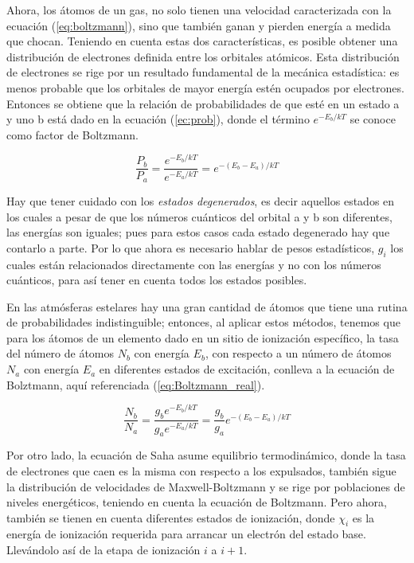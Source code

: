 \documentclass[12pt,oneside,openany,letter]{book}
\begin{document}
\noindent Ahora, los átomos de un gas, no solo tienen una velocidad caracterizada con la ecuación (\ref{eq:boltzmann}), sino  que también ganan y pierden energía a medida que chocan. Teniendo en cuenta estas dos características, es posible obtener una distribución de electrones definida entre los orbitales atómicos. Esta distribución de electrones se rige por un resultado fundamental de la mecánica estadística: es menos probable que los orbitales de mayor energía estén ocupados por electrones. Entonces se obtiene que la relación de probabilidades de que esté en un estado a y uno b está dado en la ecuación (\ref{ec:prob}), donde el término $e^{-E_{b} / k T}$ se conoce como factor de Boltzmann. 

\begin{equation}
\frac{P_b}{P_a}=\frac{e^{-E_{b} / k T}}{e^{-E_{a} / k T}}=e^{-\left(E_{b}-E_{a}\right) / k T}
\label{ec:prob}
\end{equation}

\noindent Hay que tener cuidado con los \textit{estados degenerados}, es decir aquellos estados en los cuales a pesar de que los números cuánticos del orbital a y b son diferentes, las energías son iguales; pues para estos casos cada estado degenerado hay que contarlo a parte. Por lo que ahora es necesario hablar de pesos estadísticos, $g_i$ los cuales están relacionados directamente con las energías y no con los números cuánticos, para así tener en cuenta todos los estados posibles.

\noindent En las atmósferas estelares hay una gran cantidad de átomos que tiene una rutina de probabilidades indistinguible; entonces, al aplicar estos métodos, tenemos que para los átomos de un elemento dado en un sitio de ionización específico, la tasa del número de átomos $N_b$ con energía $E_b$, con respecto a un número de átomos $N_a$ con energía $E_a$ en diferentes estados de excitación, conlleva a la ecuación de Bolztmann, aquí referenciada (\ref{eq:Boltzmann_real}).

\begin{equation}
\frac{N_{b}}{N_{a}}=\frac{g_{b} e^{-E_{b} / k T}}{g_{a} e^{-E_{a} / k T}}=\frac{g_{b}}{g_{a}} e^{-\left(E_{b}-E_{a}\right) / kT}
\label{eq:Boltzmann_real}
\end{equation}


\noindent Por otro lado, la ecuación de Saha asume equilibrio termodinámico, donde la tasa de electrones que caen es la misma con respecto a los expulsados, también sigue la distribución de velocidades de Maxwell-Boltzmann y se rige por poblaciones de niveles energéticos, teniendo en cuenta la ecuación de Boltzmann. Pero ahora, también se tienen en cuenta diferentes estados de ionización, donde $\chi_i$ es la energía de ionización requerida para arrancar un electrón del estado base. Llevándolo así de la etapa de ionización $i$ a $i+1$.
\end{document}

